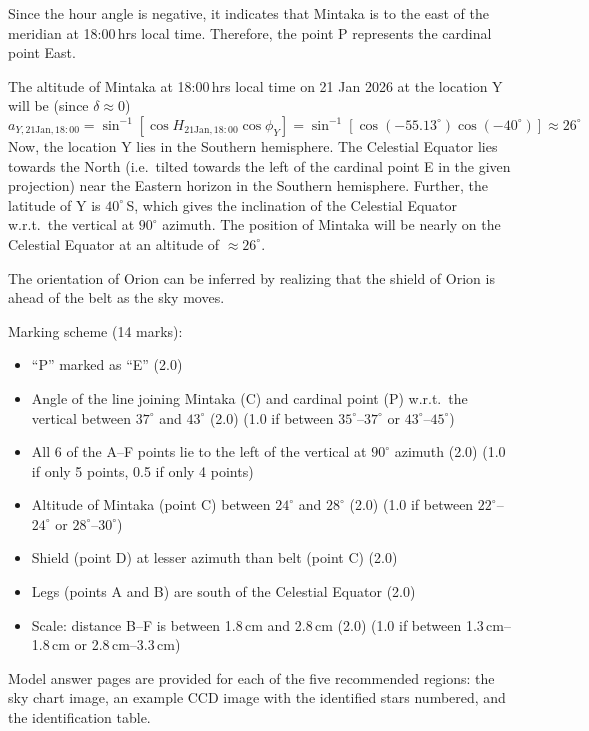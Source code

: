 Since the hour angle is negative, it indicates that Mintaka is to the east
of the meridian at 18:00\,hrs local time. Therefore, the point P represents
the cardinal point East.

The altitude of Mintaka at 18:00\,hrs local time on 21 Jan 2026 at the
location Y will be (since $\delta \approx 0$)
\[ a_{Y,\mathrm{21Jan},18:00}
   = \sin^{-1}\!\left[\cos H_{\mathrm{21Jan},18:00} \cos\phi_Y\right]
   = \sin^{-1}\!\left[\cos(-55.13^\circ)\cos(-40^\circ)\right]
   \approx 26^\circ \]
Now, the location Y lies in the Southern hemisphere. The Celestial Equator
lies towards the North (i.e.\ tilted towards the left of the cardinal point
E in the given projection) near the Eastern horizon in the Southern
hemisphere. Further, the latitude of Y is $40^\circ$\,S, which gives the
inclination of the Celestial Equator w.r.t.\ the vertical at $90^\circ$
azimuth. The position of Mintaka will be nearly on the Celestial Equator at
an altitude of $\approx 26^\circ$.

The orientation of Orion can be inferred by realizing that the shield of
Orion is ahead of the belt as the sky moves.


Marking scheme (14 marks):
\begin{itemize}
\item ``P'' marked as ``E'' \hfill(2.0)
\item Angle of the line joining Mintaka (C) and cardinal point (P) w.r.t.\
  the vertical between $37^\circ$ and $43^\circ$ \hfill(2.0)
  (1.0 if between $35^\circ$--$37^\circ$ or $43^\circ$--$45^\circ$)
\item All 6 of the A--F points lie to the left of the vertical at $90^\circ$
  azimuth \hfill(2.0)
  (1.0 if only 5 points, 0.5 if only 4 points)
\item Altitude of Mintaka (point C) between $24^\circ$ and $28^\circ$
  \hfill(2.0)
  (1.0 if between $22^\circ$--$24^\circ$ or $28^\circ$--$30^\circ$)
\item Shield (point D) at lesser azimuth than belt (point C) \hfill(2.0)
\item Legs (points A and B) are south of the Celestial Equator \hfill(2.0)
\item Scale: distance B--F is between 1.8\,cm and 2.8\,cm \hfill(2.0)
  (1.0 if between 1.3\,cm--1.8\,cm or 2.8\,cm--3.3\,cm)
\end{itemize}

Model answer pages are provided for each of the five recommended regions:
the sky chart image, an example CCD image with the identified stars
numbered, and the identification table.

